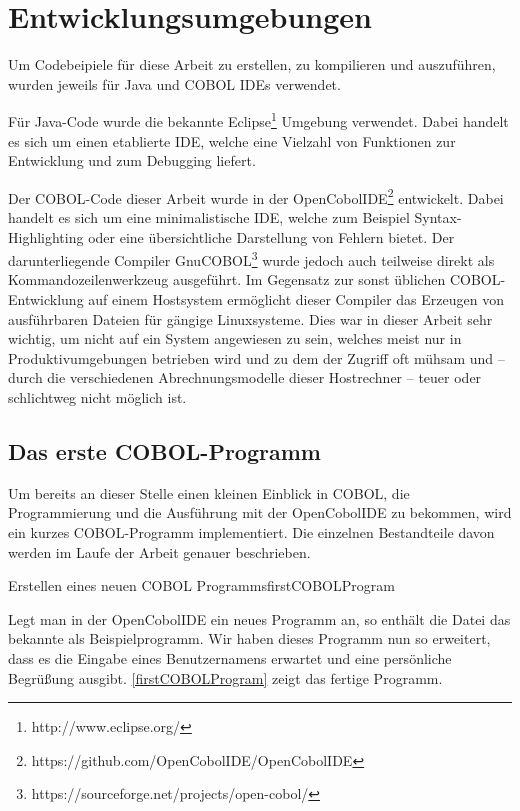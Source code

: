 \section{Entwicklungsumgebungen}
Um Codebeipiele für diese Arbeit zu erstellen, zu kompilieren und auszuführen, wurden jeweils für Java und COBOL IDEs verwendet.

Für Java-Code wurde die bekannte Eclipse\footnote{http://www.eclipse.org/} Umgebung verwendet. Dabei handelt es sich um einen etablierte IDE, welche eine Vielzahl von Funktionen zur Entwicklung und zum Debugging liefert.

Der COBOL-Code dieser Arbeit wurde in der OpenCobolIDE\footnote{https://github.com/OpenCobolIDE/OpenCobolIDE} entwickelt. Dabei handelt es sich um eine minimalistische IDE, welche zum Beispiel Syntax-Highlighting oder eine übersichtliche Darstellung von Fehlern bietet. Der darunterliegende Compiler GnuCOBOL\footnote{https://sourceforge.net/projects/open-cobol/} wurde jedoch auch teilweise direkt als Kommandozeilenwerkzeug ausgeführt. Im Gegensatz zur sonst üblichen COBOL-Entwicklung auf einem Hostsystem ermöglicht dieser Compiler das Erzeugen von ausführbaren Dateien für gängige Linuxsysteme. Dies war in dieser Arbeit sehr wichtig, um nicht auf ein System angewiesen zu sein, welches meist nur in Produktivumgebungen betrieben wird und zu dem der Zugriff oft mühsam und -- durch die verschiedenen Abrechnungsmodelle dieser Hostrechner -- teuer oder schlichtweg nicht möglich ist.

\subsection*{Das erste COBOL-Programm}

Um bereits an dieser Stelle einen kleinen Einblick in COBOL, die Programmierung und die Ausführung mit der OpenCobolIDE zu bekommen, wird ein kurzes COBOL-Programm implementiert. Die einzelnen Bestandteile davon werden im Laufe der Arbeit genauer beschrieben.

\begin{codeWithCaption}{Erstellen eines neuen COBOL Programms}{firstCOBOLProgram}
\end{codeWithCaption}

Legt man in der OpenCobolIDE ein neues Programm an, so enthält die Datei das bekannte  als Beispielprogramm. Wir haben dieses Programm nun so erweitert, dass es die Eingabe eines Benutzernamens erwartet und eine persönliche Begrüßung ausgibt. \autoref{firstCOBOLProgram} zeigt das fertige Programm.

